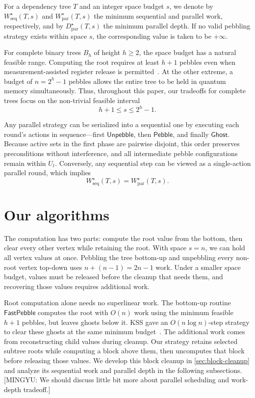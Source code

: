 \documentclass[11pt]{article}
\theoremstyle{definition}
\theoremstyle{remark}
\newcommand{\Peb}{\mathsf{Pebble}}
\newcommand{\Unp}{\mathsf{Unpebble}}
\newcommand{\Ghost}{\mathsf{Ghost}}
\newcommand{\Fast}{\mathsf{FastPebble}}
\newcommand{\Wseq}{W_{\mathrm{seq}}}
\newcommand{\Wpar}{W_{\mathrm{par}}}
\newcommand{\Dpar}{D_{\mathrm{par}}}
\newcommand{\mingyu}[1]{{\color{magenta}\footnotesize [MINGYU: #1]}} %
\begin{document}
For a dependency tree $T$ and an integer space budget $s$, we denote by $\Wseq^\star(T,s)$ and $\Wpar^\star(T,s)$ the minimum sequential and parallel work, respectively, and by $\Dpar^\star(T,s)$ the minimum parallel depth. If no valid pebbling strategy exists within space $s$, the corresponding value is taken to be $+\infty$.

For complete binary trees $B_h$ of height $h \ge 2$, the space budget has a natural feasible range. Computing the root requires at least $h+1$ pebbles even when measurement-assisted register release is permitted~\cite{Cook1973,KSS2025}. At the other extreme, a budget of $n = 2^h-1$ pebbles allows the entire tree to be held in quantum memory simultaneously. Thus, throughout this paper, our tradeoffs for complete trees focus on the non-trivial feasible interval
\begin{equation}
    h+1 \le s \le 2^h-1.
\end{equation}

Any parallel strategy can be serialized into a sequential one by executing each round's actions in sequence—first $\Unp$, then $\Peb$, and finally $\Ghost$. Because active sets in the first phase are pairwise disjoint, this order preserves preconditions without interference, and all intermediate pebble configurations remain within $U_t$. Conversely, any sequential step can be viewed as a single-action parallel round, which implies
\begin{equation}
    \Wseq^\star(T,s) = \Wpar^\star(T,s).
    \label{eq:serialize}
\end{equation}



\section{Our algorithms}
\label{sec:main-algorithms}

The computation has two parts: compute the root value from the bottom, then clear every other vertex while retaining the root. With space $s=n$, we can hold all vertex values at once. Pebbling the tree bottom-up and unpebbling every non-root vertex top-down uses $n+(n-1)=2n-1$ work. Under a smaller space budget, values must be released before the cleanup that needs them, and recovering those values requires additional work.

Root computation alone needs no superlinear work. The bottom-up routine $\Fast$ computes the root with $O(n)$ work using the minimum feasible $h+1$ pebbles, but leaves ghosts below it. KSS gave an $O(n\log n)$-step strategy to clear these ghosts at the same minimum budget~\cite[Theorem~5.5]{KSS2025}. The additional work comes from reconstructing child values during cleanup. Our strategy retains selected subtree roots while computing a block above them, then uncomputes that block before releasing those values. We develop this block cleanup in \cref{sec:block-cleanup} and analyze its sequential work and parallel depth in the following subsections. \mingyu{We should discuss little bit more about parallel scheduling and work-depth tradeoff.}
\end{document}
